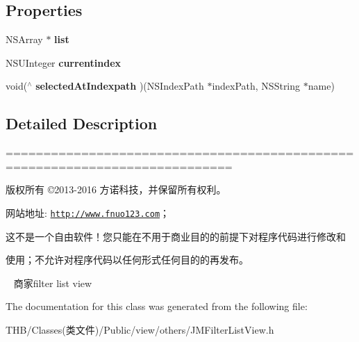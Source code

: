 \subsection*{Properties}
\begin{DoxyCompactItemize}
\item 
\mbox{\label{interface_j_m_filter_list_view_a381ec42cbbf8c5b910499f437cf389fb}} 
N\+S\+Array $\ast$ {\bfseries list}
\item 
\mbox{\label{interface_j_m_filter_list_view_a8c1370492b1463c443315776d126ef3e}} 
N\+S\+U\+Integer {\bfseries currentindex}
\item 
\mbox{\label{interface_j_m_filter_list_view_a677592e691e43b01e0c35f40aeb99ee2}} 
void($^\wedge$ {\bfseries selected\+At\+Indexpath} )(N\+S\+Index\+Path $\ast$index\+Path, N\+S\+String $\ast$name)
\end{DoxyCompactItemize}


\subsection{Detailed Description}
============================================================================

版权所有 ©2013-\/2016 方诺科技，并保留所有权利。

网站地址\+: \href{http://www.fnuo123.com}{\tt http\+://www.\+fnuo123.\+com}； 



这不是一个自由软件！您只能在不用于商业目的的前提下对程序代码进行修改和

使用；不允许对程序代码以任何形式任何目的的再发布。 



~\newline
商家filter list view 

The documentation for this class was generated from the following file\+:\begin{DoxyCompactItemize}
\item 
T\+H\+B/\+Classes(类文件)/\+Public/view/others/J\+M\+Filter\+List\+View.\+h\end{DoxyCompactItemize}
